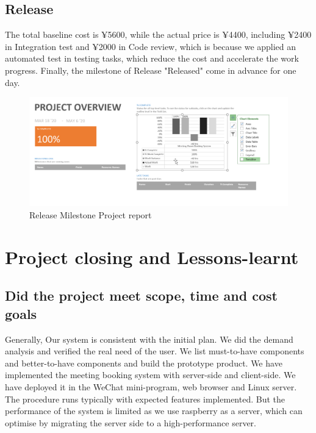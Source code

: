 \documentclass[runningheads]{llncs}
\begin{document}
\subsection{Release}
The total baseline cost is ¥5600, while the actual price is ¥4400, including ¥2400 in Integration test and ¥2000 in Code review, which is because we applied an automated test in testing tasks, which reduce the cost and accelerate the work progress. Finally, the milestone of Release "Released" come in advance for one day.

\begin{figure}[H]
  \centering
  \includegraphics[width=1.0\textwidth]{figure/projrep}
  \caption{Release Milestone Project report}
\end{figure}







\section{Project closing and Lessons-learnt}

\subsection{Did the project meet scope, time and cost goals}
Generally, Our system is consistent with the initial plan. We did the demand analysis and verified the real need of the user. We list must-to-have components and better-to-have components and build the prototype product. We have implemented the meeting booking system with server-side and client-side. We have deployed it in the WeChat mini-program, web browser and Linux server. The procedure runs typically with expected features implemented. But the performance of the system is limited as we use raspberry as a server, which can optimise by migrating the server side to a high-performance server.
\end{document}
